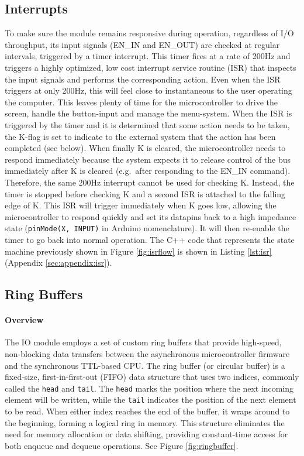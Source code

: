 \subsection{Interrupts}
To make sure the module remains responsive during operation, regardless of I/O throughput, its input signals (EN\_IN and EN\_OUT) are checked at regular intervals, triggered by a timer interrupt. This timer fires at a rate of 200Hz and triggers a highly optimized, low cost interrupt service routine (ISR) that inspects the input signals and performs the corresponding action. Even when the ISR triggers at only 200Hz, this will feel close to instantaneous to the user operating the computer. This leaves plenty of time for the microcontroller to drive the screen, handle the button-input and manage the menu-system. When the ISR is triggered by the timer and it is determined that some action needs to be taken, the K-flag is set to indicate to the external system that the action has been completed (see below). When finally K is cleared, the microcontroller needs to respond immediately because the system expects it to release control of the bus immediately after K is cleared (e.g.~after responding to the EN\_IN command). Therefore, the same 200Hz interrupt cannot be used for checking K. Instead, the timer is stopped before checking K and a second ISR is attached to the falling edge of K. This ISR will trigger immediately when K goes low, allowing the microcontroller to respond quickly and set its datapins back to a high impedance state (\texttt{pinMode(X, INPUT)} in Arduino nomenclature). It will then re-enable the timer to go back into normal operation. The C++ code that represents the state machine previously shown in Figure \ref{fig:isrflow} is shown in Listing \ref{lst:isr} (Appendix \ref{sec:appendix:isr}).


\subsection{Ring Buffers}
\paragraph{Overview} The IO module employs a set of custom ring buffers that provide high-speed, non-blocking data transfers between the asynchronous microcontroller firmware and the synchronous TTL-based CPU. The ring buffer (or circular buffer) is a fixed-size, first-in-first-out (FIFO) data structure that uses two indices, commonly called the \texttt{head} and \texttt{tail}. The \texttt{head} marks the position where the next incoming element will be written, while the \texttt{tail} indicates the position of the next element to be read. When either index reaches the end of the buffer, it wraps around to the beginning, forming a logical ring in memory. This structure eliminates the need for memory allocation or data shifting, providing constant-time access for both enqueue and dequeue operations. See Figure \ref{fig:ringbuffer}.

